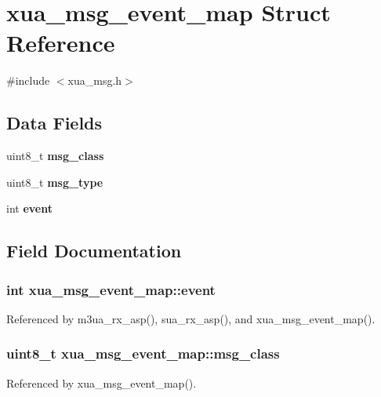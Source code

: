 \section{xua\+\_\+msg\+\_\+event\+\_\+map Struct Reference}
\label{structxua__msg__event__map}


{\ttfamily \#include $<$xua\+\_\+msg.\+h$>$}

\subsection*{Data Fields}
\begin{DoxyCompactItemize}
\item 
uint8\+\_\+t {\bf msg\+\_\+class}
\item 
uint8\+\_\+t {\bf msg\+\_\+type}
\item 
int {\bf event}
\end{DoxyCompactItemize}


\subsection{Field Documentation}
\subsubsection[{event}]{\setlength{\rightskip}{0pt plus 5cm}int xua\+\_\+msg\+\_\+event\+\_\+map\+::event}\label{structxua__msg__event__map_abae82f509c458980122792edcf258eed}


Referenced by m3ua\+\_\+rx\+\_\+asp(), sua\+\_\+rx\+\_\+asp(), and xua\+\_\+msg\+\_\+event\+\_\+map().

\subsubsection[{msg\+\_\+class}]{\setlength{\rightskip}{0pt plus 5cm}uint8\+\_\+t xua\+\_\+msg\+\_\+event\+\_\+map\+::msg\+\_\+class}\label{structxua__msg__event__map_a965197799d6114a1c108997b34fe11cd}


Referenced by xua\+\_\+msg\+\_\+event\+\_\+map().

